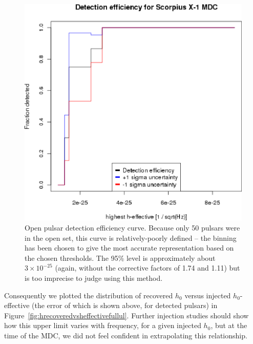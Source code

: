 \begin{figure}
\begin{center}
\includegraphics[width=0.68\paperwidth,height=0.51\paperheight]{detectionVsHeffective.eps}
\caption{ Open pulsar detection efficiency curve.
Because only 50 pulsars were in the open set, this curve is relatively-poorly defined -- the binning has been chosen to give the most accurate representation based on the chosen thresholds.
The 95\% level is approximately about $3 \times 10^{-25}$ (again, without the corrective factors of 1.74 and 1.11) but is too imprecise to judge using this method.
\label{fig:detectionvsheffective}}
\end{center}
\end{figure}


Consequently we plotted the distribution of recovered $h_0$ versus injected $h_0$-effective (the error of which is shown above, for detected pulsars)  in Figure~\ref{fig:hrecoveredvsheffectivefullul}. Further injection studies should show how this upper limit varies with frequency, for a given injected $h_0$, but at the time of the MDC, we did not feel confident in extrapolating this relationship.

